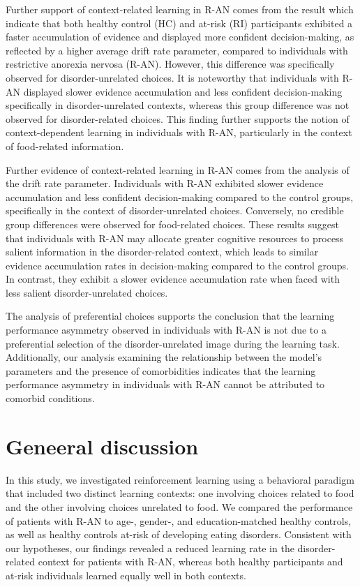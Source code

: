 \documentclass[
  man,floatsintext]{apa6}
\begin{document}
Further support of context-related learning in R-AN comes from the result which indicate that both healthy control (HC) and at-risk (RI) participants exhibited a faster accumulation of evidence and displayed more confident decision-making, as reflected by a higher average drift rate parameter, compared to individuals with restrictive anorexia nervosa (R-AN). However, this difference was specifically observed for disorder-unrelated choices. It is noteworthy that individuals with R-AN displayed slower evidence accumulation and less confident decision-making specifically in disorder-unrelated contexts, whereas this group difference was not observed for disorder-related choices. This finding further supports the notion of context-dependent learning in individuals with R-AN, particularly in the context of food-related information.

Further evidence of context-related learning in R-AN comes from the analysis of the drift rate parameter. Individuals with R-AN exhibited slower evidence accumulation and less confident decision-making compared to the control groups, specifically in the context of disorder-unrelated choices. Conversely, no credible group differences were observed for food-related choices. These results suggest that individuals with R-AN may allocate greater cognitive resources to process salient information in the disorder-related context, which leads to similar evidence accumulation rates in decision-making compared to the control groups. In contrast, they exhibit a slower evidence accumulation rate when faced with less salient disorder-unrelated choices.

The analysis of preferential choices supports the conclusion that the learning performance asymmetry observed in individuals with R-AN is not due to a preferential selection of the disorder-unrelated image during the learning task. Additionally, our analysis examining the relationship between the model's parameters and the presence of comorbidities indicates that the learning performance asymmetry in individuals with R-AN cannot be attributed to comorbid conditions.

\hypertarget{geneeral-discussion}{%
\section{Geneeral discussion}\label{geneeral-discussion}}

In this study, we investigated reinforcement learning using a behavioral paradigm that included two distinct learning contexts: one involving choices related to food and the other involving choices unrelated to food. We compared the performance of patients with R-AN to age-, gender-, and education-matched healthy controls, as well as healthy controls at-risk of developing eating disorders. Consistent with our hypotheses, our findings revealed a reduced learning rate in the disorder-related context for patients with R-AN, whereas both healthy participants and at-risk individuals learned equally well in both contexts.
\end{document}
